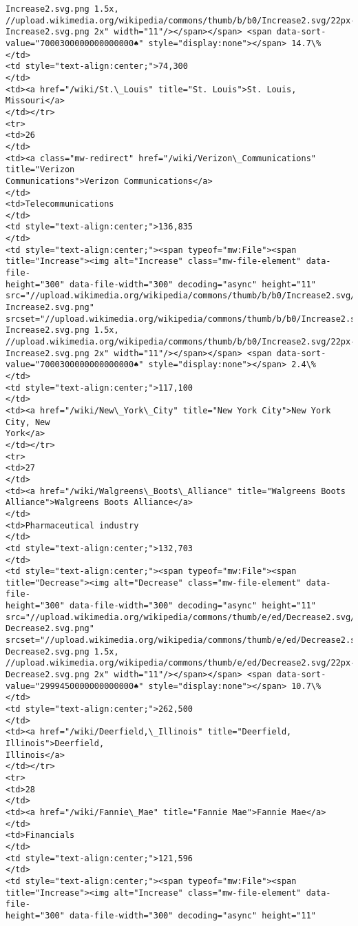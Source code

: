 \documentclass[11pt]{article}
\begin{document}
\begin{Verbatim}[commandchars=\\\{\}]
Increase2.svg.png 1.5x,
//upload.wikimedia.org/wikipedia/commons/thumb/b/b0/Increase2.svg/22px-
Increase2.svg.png 2x" width="11"/></span></span> <span data-sort-
value="7000300000000000000♠" style="display:none"></span> 14.7\%
</td>
<td style="text-align:center;">74,300
</td>
<td><a href="/wiki/St.\_Louis" title="St. Louis">St. Louis, Missouri</a>
</td></tr>
<tr>
<td>26
</td>
<td><a class="mw-redirect" href="/wiki/Verizon\_Communications" title="Verizon
Communications">Verizon Communications</a>
</td>
<td>Telecommunications
</td>
<td style="text-align:center;">136,835
</td>
<td style="text-align:center;"><span typeof="mw:File"><span
title="Increase"><img alt="Increase" class="mw-file-element" data-file-
height="300" data-file-width="300" decoding="async" height="11"
src="//upload.wikimedia.org/wikipedia/commons/thumb/b/b0/Increase2.svg/11px-
Increase2.svg.png"
srcset="//upload.wikimedia.org/wikipedia/commons/thumb/b/b0/Increase2.svg/17px-
Increase2.svg.png 1.5x,
//upload.wikimedia.org/wikipedia/commons/thumb/b/b0/Increase2.svg/22px-
Increase2.svg.png 2x" width="11"/></span></span> <span data-sort-
value="7000300000000000000♠" style="display:none"></span> 2.4\%
</td>
<td style="text-align:center;">117,100
</td>
<td><a href="/wiki/New\_York\_City" title="New York City">New York City, New
York</a>
</td></tr>
<tr>
<td>27
</td>
<td><a href="/wiki/Walgreens\_Boots\_Alliance" title="Walgreens Boots
Alliance">Walgreens Boots Alliance</a>
</td>
<td>Pharmaceutical industry
</td>
<td style="text-align:center;">132,703
</td>
<td style="text-align:center;"><span typeof="mw:File"><span
title="Decrease"><img alt="Decrease" class="mw-file-element" data-file-
height="300" data-file-width="300" decoding="async" height="11"
src="//upload.wikimedia.org/wikipedia/commons/thumb/e/ed/Decrease2.svg/11px-
Decrease2.svg.png"
srcset="//upload.wikimedia.org/wikipedia/commons/thumb/e/ed/Decrease2.svg/17px-
Decrease2.svg.png 1.5x,
//upload.wikimedia.org/wikipedia/commons/thumb/e/ed/Decrease2.svg/22px-
Decrease2.svg.png 2x" width="11"/></span></span> <span data-sort-
value="2999450000000000000♠" style="display:none"></span> 10.7\%
</td>
<td style="text-align:center;">262,500
</td>
<td><a href="/wiki/Deerfield,\_Illinois" title="Deerfield, Illinois">Deerfield,
Illinois</a>
</td></tr>
<tr>
<td>28
</td>
<td><a href="/wiki/Fannie\_Mae" title="Fannie Mae">Fannie Mae</a>
</td>
<td>Financials
</td>
<td style="text-align:center;">121,596
</td>
<td style="text-align:center;"><span typeof="mw:File"><span
title="Increase"><img alt="Increase" class="mw-file-element" data-file-
height="300" data-file-width="300" decoding="async" height="11"

\end{Verbatim}
\end{document}
